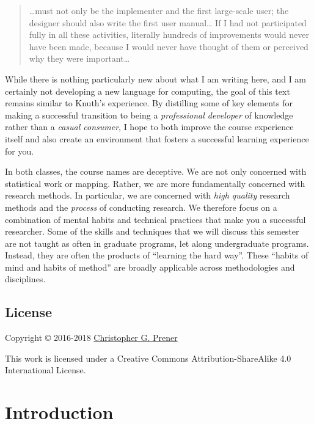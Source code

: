 \documentclass[]{book}
\theoremstyle{definition}
\theoremstyle{definition}
\theoremstyle{definition}
\theoremstyle{remark}
\begin{document}
\begin{quote}
\ldots{}must not only be the implementer and the first large-scale user;
the designer should also write the first user manual\ldots{} If I had
not participated fully in all these activities, literally hundreds of
improvements would never have been made, because I would never have
thought of them or perceived why they were important\ldots{}
\end{quote}

While there is nothing particularly new about what I am writing here,
and I am certainly not developing a new language for computing, the goal
of this text remains similar to Knuth's experience. By distilling some
of key elements for making a successful transition to being a
\emph{professional developer} of knowledge rather than a \emph{casual
consumer}, I hope to both improve the course experience itself and also
create an environment that fosters a successful learning experience for
you.

In both classes, the course names are deceptive. We are not only
concerned with statistical work or mapping. Rather, we are more
fundamentally concerned with research methods. In particular, we are
concerned with \emph{high quality} research methods and the
\emph{process} of conducting research. We therefore focus on a
combination of mental habits and technical practices that make you a
successful researcher. Some of the skills and techniques that we will
discuss this semester are not taught as often in graduate programs, let
along undergraduate programs. Instead, they are often the products of
``learning the hard way''. These ``habits of mind and habits of method''
are broadly applicable across methodologies and disciplines.

\section*{License}\label{license}

Copyright © 2016-2018 \href{https://chris-prener.github.io}{Christopher
G. Prener}

This work is licensed under a Creative Commons Attribution-ShareAlike
4.0 International License.

\hypertarget{intro}{\chapter{Introduction}\label{intro}}
\end{document}
